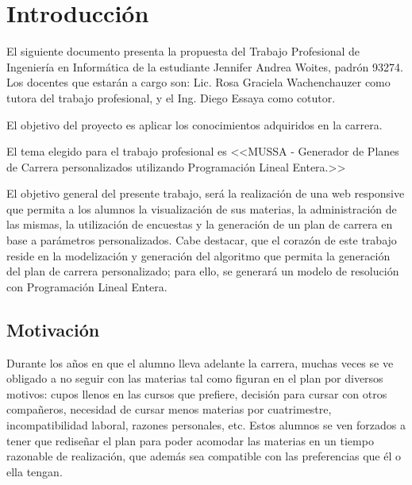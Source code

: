 \documentclass[a4paper]{article}
\begin{document}
  \newpage
  

  \tableofcontents %
    
  \pagestyle{fancy} %
  \rhead{}
  \renewcommand{\headrulewidth}{0.4pt} %

  \newpage


\section{Introducción}

El siguiente documento presenta la propuesta del Trabajo Profesional de Ingeniería en Informática de la estudiante Jennifer Andrea Woites, padrón 93274. Los docentes que estarán a cargo son: Lic. Rosa Graciela Wachenchauzer como tutora del trabajo profesional, y el Ing. Diego Essaya como cotutor. \newline

El objetivo del proyecto es aplicar los conocimientos adquiridos en la carrera. \newline

El tema elegido para el trabajo profesional es <<MUSSA - Generador de Planes de Carrera personalizados utilizando Programación Lineal Entera.>> \newline

El objetivo general del presente trabajo, será la realización de una web responsive que permita a los alumnos la visualización de sus materias, la administración de las mismas, la utilización de encuestas y la generación de un plan de carrera en base a parámetros personalizados. Cabe destacar, que el corazón de este trabajo reside en la modelización y generación del algoritmo que permita la generación del plan de carrera personalizado; para ello, se generará un modelo de resolución con Programación Lineal Entera.

\subsection{Motivación}

Durante los años en que el alumno lleva adelante la carrera, muchas veces se ve obligado a no seguir con las materias tal como figuran en el plan por diversos motivos: cupos llenos en las cursos que prefiere, decisión para cursar con otros compañeros, necesidad de cursar menos materias por cuatrimestre, incompatibilidad laboral, razones personales, etc. Estos alumnos se ven forzados a tener que rediseñar el plan para poder acomodar las materias en un tiempo razonable de realización, que además sea compatible con las preferencias que él o ella tengan.
\end{document}
